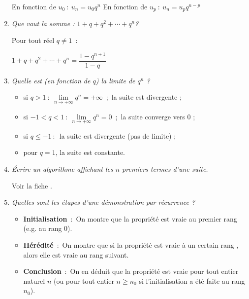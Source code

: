 \begin{reponses}
\begin{enumerate}
          En fonction de $u_0~:~u_n=u_0q^n$
          En fonction de $u_p~:~u_n=u_pq^{n-p}$
          \item %
          \textit{ Que vaut la somme : $1+q+q^2+\cdots+q^n $?}
          \par
          Pour tout réel $q \neq 1$~:
          \par
          $1+q+q^2+\cdots+q^n =\dfrac{1-q^{n+1}}{1-q}$
          \item %
          \textit{Quelle est (en fonction de $q$) la limite de $q^n$ ?}
          \begin{itemize}
               \item %
               si $q>1~:~\lim\limits_{n \rightarrow +\infty }q^n=+\infty$~;~la suite est divergente ;
               \item %
               si $-1<q<1~:~\lim\limits_{n \rightarrow +\infty }q^n=0$~;~la suite converge vers 0 ;
               \item %
               si $q \leqslant -1~:$~la suite est divergente (pas de limite) ;
               \item %
               pour $q=1$, la suite est constante.
          \end{itemize}
          \item %
          \textit{Écrire un algorithme affichant les $n$ premiers termes d'une suite.}
          \par
          Voir la fiche .
          \item %
          \textit{ Quelles sont les étapes d'une démonstration par récurrence ?}
          \begin{itemize}
               \item %
               \textbf{Initialisation}~:~On montre que la propriété est vraie au premier rang (e.g. au rang 0).
               \item %
               \textbf{Hérédité}~:~On montre que si la propriété est vraie à un certain rang , alors elle est vraie au rang suivant.
               \item %
               \textbf{Conclusion}~:~On en déduit que la propriété est vraie pour tout entier naturel $n$ (ou pour tout entier $n \geqslant n_0$ si l'initialisation a été faite au rang $n_0$).
          \end{itemize}
     \end{enumerate}
\end{reponses}
